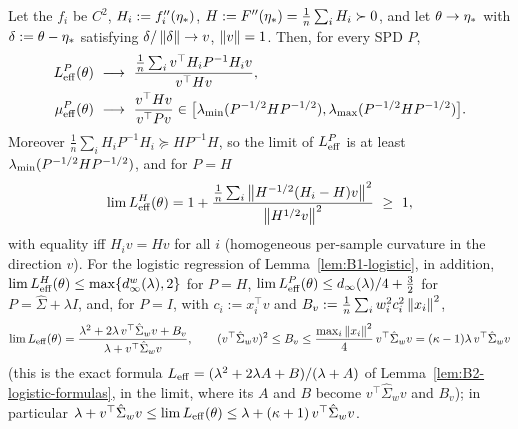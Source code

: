 \begin{lemma}\label{lem:B1-asymptotic}
Let the $f_i$ be $C^2$, $H_i:=f_i''(\eta_\ast)$, $H:=F''(\eta_\ast)=\frac1n\sum_iH_i\succ0$, and let
$\theta\to\eta_\ast$ with $\delta:=\theta-\eta_\ast$ satisfying $\delta/\left\|\delta\right\|\to v$, $\left\|v\right\|=1$. Then, for
every SPD $P$,
\begin{align}
L_{\mathrm{eff}}^P(\theta)&\ \longrightarrow\ \frac{\frac1n\sum_i v^\top H_iP^{-1}H_iv}{v^\top Hv},\label{eq:B1-asymptotic}\\
\mu_{\mathrm{eff}}^P(\theta)&\ \longrightarrow\ \frac{v^\top Hv}{v^\top Pv}
\in\big[\lambda_{\min}(P^{-1/2}HP^{-1/2}),\lambda_{\max}(P^{-1/2}HP^{-1/2})\big].\nonumber
\end{align}
Moreover $\frac1n\sum_iH_iP^{-1}H_i\succeq HP^{-1}H$, so the limit of $L_{\mathrm{eff}}^P$ is at least
$\lambda_{\min}(P^{-1/2}HP^{-1/2})$, and for $P=H$
\begin{equation}\label{eq:B1-asymptotic-newton}
\lim\LEff^H(\theta)=1+\frac{\frac1n\sum_i\norm{H^{-1/2}(H_i-H)v}^2}{\norm{H^{1/2}v}^2}\ \ge\ 1,
\end{equation}
with equality iff $H_iv=Hv$ for all $i$ (homogeneous per-sample curvature in the direction $v$).
For the logistic regression of Lemma~\ref{lem:B1-logistic}, in addition,
$\lim L_{\mathrm{eff}}^H(\theta)\le\max\{d^w_\infty(\lambda),2\}$ for $P=H$,
$\lim L_{\mathrm{eff}}^P(\theta)\le d_\infty(\lambda)/4+\frac32$ for $P=\hat\Sigma+\lambda I$, and, for $P=I$, with
$c_i:=x_i^\top v$ and $B_v:=\frac1n\sum_iw_i^2c_i^2\left\|x_i\right\|^2$,
\begin{equation}\label{eq:B1-asymptotic-I}
\lim L_{\mathrm{eff}}(\theta)=\frac{\lambda^2+2\lambda\,v^\top\hat\Sigma_wv+B_v}{\lambda+v^\top\hat\Sigma_wv},
\qquad
(v^\top\hat\Sigma_wv)^2\le B_v\le\frac{\max_i\left\|x_i\right\|^2}{4}\,v^\top\hat\Sigma_wv=(\kappa-1)\lambda\,v^\top\hat\Sigma_wv
\end{equation}
(this is the exact formula $L_{\mathrm{eff}}=(\lambda^2+2\lambda A+B)/(\lambda+A)$ of Lemma~\ref{lem:B2-logistic-formulas}, in
the limit, where its $A$ and $B$ become $v^\top\hat\Sigma_wv$ and $B_v$); in
particular $\lambda+v^\top\hat\Sigma_wv\le\lim L_{\mathrm{eff}}(\theta)\le\lambda+(\kappa+1)\,v^\top\hat\Sigma_wv$.
\end{lemma}
